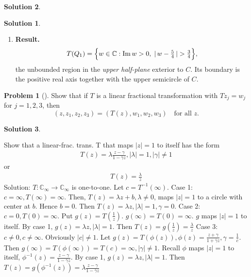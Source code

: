 \documentclass[12pt]{article}
\theoremstyle{definition} %
\newtheorem{solution}{Solution}
\newtheorem{problem}{Problem}
\theoremstyle{plain} %
\begin{document}
\begin{solution}
\begin{solution}
\begin{enumerate}
        \item \textbf{Result.}\\
              \[
                  T(Q_1)=
                  \Bigl\{
                    w\in\mathbb{C} :
                    \operatorname{Im}w>0,\;
                    |\,w-\tfrac54\,|>\tfrac34
                  \Bigr\},
              \]
              the unbounded region in the \emph{upper half-plane} exterior to \(C\).
              Its boundary is the positive real axis together with the upper semicircle of \(C\).
      \end{enumerate}
      \end{solution} 
\end{solution}
\begin{problem}[]
Show that if $T$ is a linear fractional transformation with $Tz_j = w_j$ for $j = 1, 2, 3$, then
\[
    (z, z_1, z_2, z_3) = (T(z), w_1, w_2, w_3)
    \quad\text{for all } z.
\]
\end{problem}
\begin{solution}
  
\end{solution}

Show that a linear-frac. trans. T that maps $\left\vert z \right\vert =1$ to itself has the form 
\begin{align}
   T(z)=\lambda \frac{z-\gamma}{1-\overline{\gamma} z}, \left\vert \lambda \right\vert =1, \left\vert \gamma \right\vert \neq 1
\end{align} 
or 
\begin{align}
   T(z) = \frac{\lambda}{z}
\end{align} 
Solution:
$T: \mathbb{{C}}_{\infty} \to \mathbb{{C}}_{\infty} $ is one-to-one. Let $c= T^{-1}(\infty)$.
Case 1:
$c=\infty, T(\infty) = \infty$. Then, $T(z) = \lambda z + b, \lambda \neq  0$, maps $\left\vert z \right\vert =1$ to a circle with center at $b$. Hence $ b=0$. Then $T(z) = \lambda z, \left\vert \lambda \right\vert=1, \gamma = 0$. 
Case 2: $c=0, T(0)=\infty$. Put $g(z) = T(\frac{1}{z})$. $g(\infty) = T(0)= \infty$. $g$ maps $\left\vert z \right\vert =1$ to itself. By case 1, $g(z) = \lambda z, \left\vert \lambda \right\vert = 1. $ Then $T(z) = g(\frac{1}{z}) = \frac{\lambda}{z}$
Case 3:
$c\neq 0, c\neq  \infty$. Obviously $\left\vert c \right\vert \neq 1$. Let $g(z) = T(\phi(z)), \phi(z) = \frac{z+\gamma}{1+\overline{\gamma} z}, \gamma = \frac{1}{\overline{c} }$. Then $g(\infty) = T(\phi(\infty))=T(c) = \infty, \left\vert \gamma \right\vert \neq 1$. Recall $\phi$ maps $\left\vert z \right\vert =1$ to itself, $\phi^{-1}(z)= \frac{z-\gamma}{1-\overline{\gamma} z}$. By case 1, $g(z)=\lambda z, \left\vert \lambda \right\vert =1$. Then $T(z) = g(\phi^{-1}(z))= \lambda \frac{z-\gamma}{1-\overline{\gamma} z}$  
\end{document}
